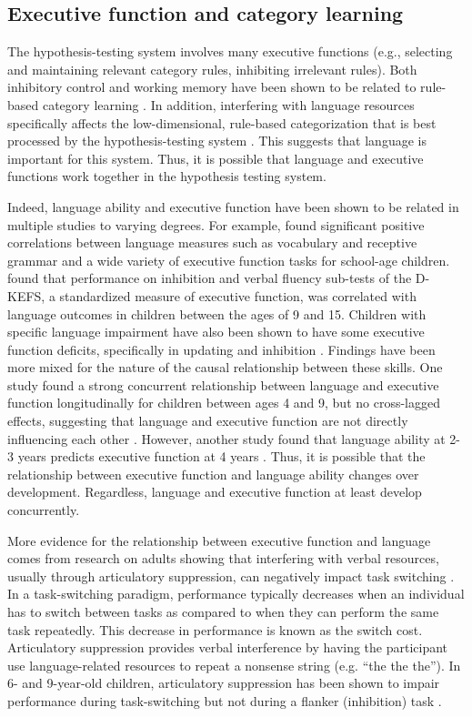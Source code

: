 \documentclass[../dissertation.tex]{subfiles}
\begin{document}
\subsection{Executive function and category learning}
The hypothesis-testing system involves many executive functions (e.g., selecting and maintaining relevant category rules, inhibiting irrelevant rules). Both inhibitory control and working memory have been shown to be related to rule-based category learning \citep{Rabi2014}. In addition, interfering with language resources specifically affects the low-dimensional, rule-based categorization that is best processed by the hypothesis-testing system \citep{Lupyan2009,Minda2008}. This suggests that language is important for this system. Thus, it is possible that language and executive functions work together in the hypothesis testing system. \par
	Indeed, language ability and executive function have been shown to be related in multiple studies to varying degrees. For example, \citet{Figueras2008} found significant positive correlations between language measures such as vocabulary and receptive grammar and a wide variety of executive function tasks for school-age children. \citet{Berninger2017} found that performance on inhibition and verbal fluency sub-tests of the D-KEFS, a standardized measure of executive function, was correlated with language outcomes in children between the ages of 9 and 15. Children with specific language impairment have also been shown to have some executive function deficits, specifically in updating and inhibition \citep{Im-Bolter2006}. Findings have been more mixed for the nature of the causal relationship between these skills. One study found a strong concurrent relationship between language and executive function longitudinally for children between ages 4 and 9, but no cross-lagged effects, suggesting that language and executive function are not directly influencing each other \citep{Gooch2016}. However, another study found that language ability at 2-3 years predicts executive function at 4 years \citep{Kuhn2014}. Thus, it is possible that the relationship between executive function and language ability changes over development. Regardless, language and executive function at least develop concurrently. \par
	More evidence for the relationship between executive function and language comes from research on adults showing that interfering with verbal resources, usually through articulatory suppression, can negatively impact task switching \citep{Baddeley2001,Emerson2003}. In a task-switching paradigm, performance typically decreases when an individual has to switch between tasks as compared to when they can perform the same task repeatedly. This decrease in performance is known as the switch cost. Articulatory suppression provides verbal interference by having the participant use language-related resources to repeat a nonsense string (e.g. “the the the”). In 6- and 9-year-old children, articulatory suppression has been shown to impair performance during task-switching but not during a flanker (inhibition) task \citep{Fatzer2012}. \par
\end{document}
